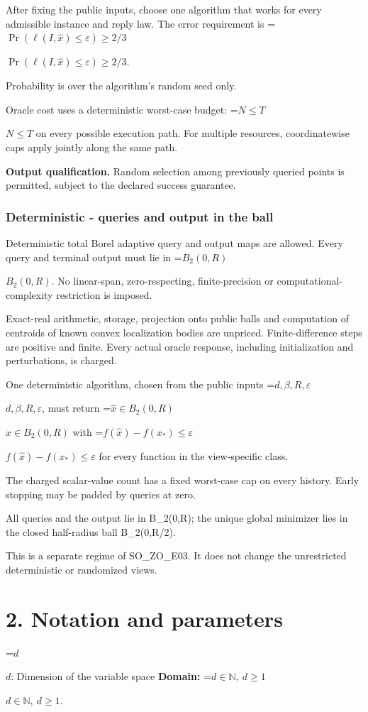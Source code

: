 \documentclass[10pt,a4paper]{article}
\newcommand{\AtlasMath}[1]{\par\begingroup\centering\setbox0=\hbox{$\displaystyle #1$}\ifdim\wd0>1.4\linewidth\typeout{ATLAS WIDE FORMULA: \the\wd0}\fi\ifdim\wd0>\linewidth\resizebox{\linewidth}{!}{\box0}\else\box0\fi\par\endgroup}
\newcommand{\AtlasInlineMath}[1]{\begingroup\setbox0=\hbox{$#1$}\ifdim\wd0>.4\linewidth\endgroup\AtlasMath{#1}\else\endgroup$#1$\fi}
\begin{document}
After fixing the public inputs, choose one algorithm that works for every admissible instance and reply law. The error requirement is \AtlasInlineMath{\Pr(\ell(I,\widehat{x})\le \varepsilon)\ge2/3}.

Probability is over the algorithm's random seed only.

Oracle cost uses a deterministic worst-case budget: \AtlasInlineMath{N\le T} on every possible execution path. For multiple resources, coordinatewise caps apply jointly along the same path.

\textbf{Output qualification.} Random selection among previously queried points is permitted, subject to the declared success guarantee.

\subsubsection{Deterministic - queries and output in the ball}
Deterministic total Borel adaptive query and output maps are allowed. Every query and terminal output must lie in \AtlasInlineMath{B_2(0,R)}. No linear-span, zero-respecting, finite-precision or computational-complexity restriction is imposed.

Exact-real arithmetic, storage, projection onto public balls and computation of centroids of known convex localization bodies are unpriced. Finite-difference steps are positive and finite. Every actual oracle response, including initialization and perturbations, is charged.

One deterministic algorithm, chosen from the public inputs \AtlasInlineMath{d,\beta,R,\varepsilon}, must return \AtlasInlineMath{\widehat x\in B_2(0,R)} with \AtlasInlineMath{f(\widehat x)-f(x_*)\le\varepsilon} for every function in the view-specific class.

The charged scalar-value count has a fixed worst-case cap on every history. Early stopping may be padded by queries at zero.

All queries and the output lie in B\_2(0,R); the unique global minimizer lies in the closed half-radius ball B\_2(0,R/2).

This is a separate regime of SO\_ZO\_E03. It does not change the unrestricted deterministic or randomized views.

\section{2. Notation and parameters}
\AtlasInlineMath{d}: Dimension of the variable space \textbf{Domain:} \AtlasInlineMath{d\in\mathbb{N},\ d\ge1}.
\end{document}
